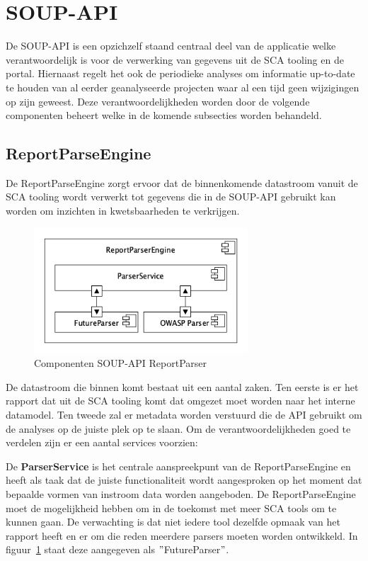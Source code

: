 \section{SOUP-API}\label{sec:soup-api}
De SOUP-API is een opzichzelf staand centraal deel van de applicatie welke verantwoordelijk is voor de verwerking van gegevens uit de SCA tooling en de portal. Hiernaast regelt het ook de periodieke analyses om informatie up-to-date te houden van al eerder geanalyseerde projecten waar al een tijd geen wijzigingen op zijn geweest. Deze verantwoordelijkheden worden door de volgende componenten beheert welke in de komende subsecties worden behandeld.

\subsection{ReportParseEngine}\label{subsec:reportparseengine}
De ReportParseEngine zorgt ervoor dat de binnenkomende datastroom vanuit de SCA tooling wordt verwerkt tot gegevens die in de SOUP-API gebruikt kan worden om inzichten in kwetsbaarheden te verkrijgen.


\begin{figure}[bth]
    \myfloatalign
    \includegraphics[width=8cm]{gfx/umlet/exports/ReportParserComponents}
    \caption{Componenten SOUP-API ReportParser}
    \label{fig:SOUPAPIReportParserComps}
\end{figure}

De datastroom die binnen komt bestaat uit een aantal zaken. Ten eerste is er het rapport dat uit de SCA tooling komt dat omgezet moet worden naar het interne datamodel. Ten tweede zal er metadata worden verstuurd die de API gebruikt om de analyses op de juiste plek op te slaan. Om de verantwoordelijkheden goed te verdelen zijn er een aantal services voorzien:

De \textbf{ParserService} is het centrale aanspreekpunt van de ReportParseEngine en heeft als taak dat de juiste functionaliteit wordt aangesproken op het moment dat bepaalde vormen van instroom data worden aangeboden. De ReportParseEngine moet de mogelijkheid hebben om in de toekomst met meer SCA tools om te kunnen gaan. De verwachting is dat niet iedere tool dezelfde opmaak van het rapport heeft en er om die reden meerdere parsers moeten worden ontwikkeld. In figuur~\ref{fig:SOUPAPIReportParserComps} staat deze aangegeven als $"$FutureParser$"$.


